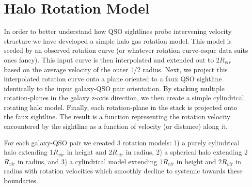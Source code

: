 \documentclass[iop]{emulateapj-rtx4}
\begin{document}
\section{Halo Rotation Model}
In order to better understand how QSO sightlines probe intervening velocity structure we have developed a simple halo gas rotation model. This model is seeded by an observed rotation curve (or whatever rotation curve-esque data suits ones fancy). This input curve is then interpolated and extended out to 2$R_{vir}$ based on the average velocity of the outer 1/2 radius. Next, we project this interpolated rotation curve onto a plane oriented to a faux QSO sightline identically to the input galaxy-QSO pair orientation. By stacking multiple rotation-planes in the galaxy z-axis direction, we then create a simple cylindrical rotating halo model. Finally, each rotation-plane in the stack is projected onto the faux sightline. The result is a function representing the rotation velocity encountered by the sightline as a function of velocity (or distance) along it.

For each galaxy-QSO pair we created 3 rotation models: 1) a purely cylindrical halo extending 1$R_{vir}$ in height and 2$R_{vir}$ in radius, 2) a spherical halo extending 2$R_{vir}$ in radius, and 3) a cylindrical model extending 1$R_{vir}$ in height and 2$R_{vir}$ in radius with rotation velocities which smoothly decline to systemic towards these boundaries.



\end{document}
